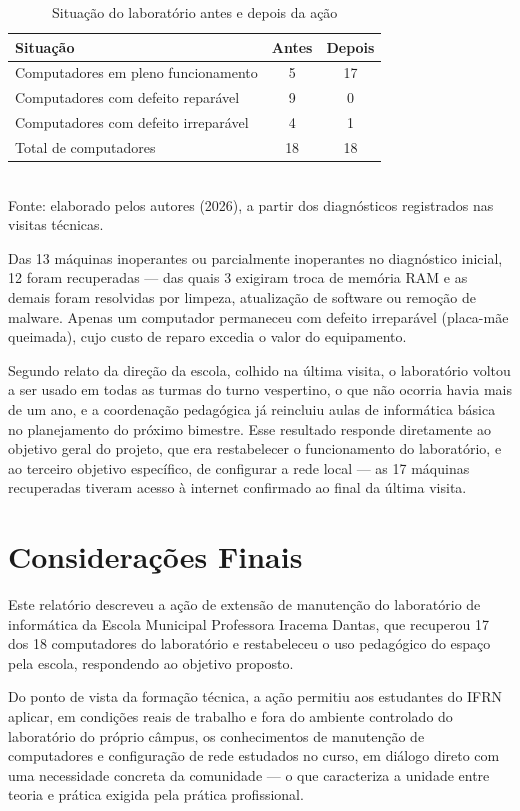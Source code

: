 \documentclass[article,12pt,a4paper]{abntex2}
\begin{document}
\begin{table}[!ht]
  \centering
  \caption{Situação do laboratório antes e depois da ação}
  \label{tab:resultados-ext}
  \begin{tabular}{lcc}
    \hline
    Situação & Antes & Depois \\
    \hline
    Computadores em pleno funcionamento & 5 & 17 \\
    Computadores com defeito reparável  & 9 & 0  \\
    Computadores com defeito irreparável & 4 & 1  \\
    Total de computadores & 18 & 18 \\
    \hline
  \end{tabular}
  \\[0.3em]
  {\footnotesize Fonte: elaborado pelos autores (2026), a partir dos diagnósticos registrados nas visitas técnicas.}
\end{table}

Das 13 máquinas inoperantes ou parcialmente inoperantes no diagnóstico
inicial, 12 foram recuperadas — das quais 3 exigiram troca de memória RAM
e as demais foram resolvidas por limpeza, atualização de software ou
remoção de malware. Apenas um computador permaneceu com defeito
irreparável (placa-mãe queimada), cujo custo de reparo excedia o valor do
equipamento.

Segundo relato da direção da escola, colhido na última visita, o
laboratório voltou a ser usado em todas as turmas do turno vespertino, o
que não ocorria havia mais de um ano, e a coordenação pedagógica já
reincluiu aulas de informática básica no planejamento do próximo bimestre.
Esse resultado responde diretamente ao objetivo geral do projeto, que era
restabelecer o funcionamento do laboratório, e ao terceiro objetivo
específico, de configurar a rede local — as 17 máquinas recuperadas
tiveram acesso à internet confirmado ao final da última visita.

\section{Considerações Finais}

Este relatório descreveu a ação de extensão de manutenção do laboratório
de informática da Escola Municipal Professora Iracema Dantas, que
recuperou 17 dos 18 computadores do laboratório e restabeleceu o uso
pedagógico do espaço pela escola, respondendo ao objetivo proposto.

Do ponto de vista da formação técnica, a ação permitiu aos estudantes do
IFRN aplicar, em condições reais de trabalho e fora do ambiente controlado
do laboratório do próprio câmpus, os conhecimentos de manutenção de
computadores e configuração de rede estudados no curso, em diálogo direto
com uma necessidade concreta da comunidade — o que caracteriza a unidade
entre teoria e prática exigida pela prática profissional.
\end{document}
